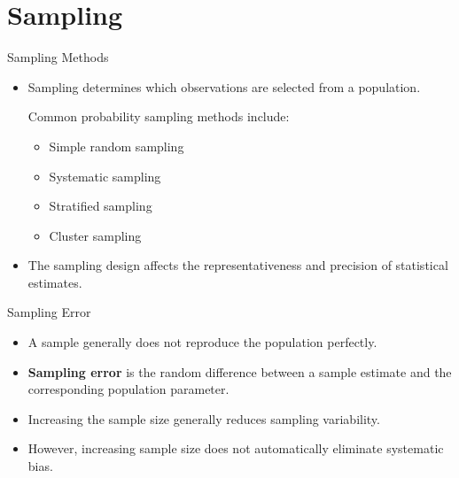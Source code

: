 \documentclass{beamer}
\begin{document}

\section{Sampling}

\begin{frame}{Sampling Methods}

\begin{itemize}

  \item Sampling determines which observations are selected from a population.

  \vskip 0.4cm

  Common probability sampling methods include:

  \begin{itemize}
    \item Simple random sampling
    \item Systematic sampling
    \item Stratified sampling
    \item Cluster sampling
  \end{itemize}

  \vskip 0.4cm

  \item The sampling design affects the representativeness and precision of statistical estimates.

\end{itemize}

\end{frame}


\begin{frame}{Sampling Error}

\begin{itemize}

  \item A sample generally does not reproduce the population perfectly.

  \vskip 0.4cm

  \item \textbf{Sampling error} is the random difference between a sample estimate and the corresponding population parameter.

  \vskip 0.4cm

  \item Increasing the sample size generally reduces sampling variability.

  \vskip 0.4cm

  \item However, increasing sample size does not automatically eliminate systematic bias.

\end{itemize}

\end{frame}
\end{document}

